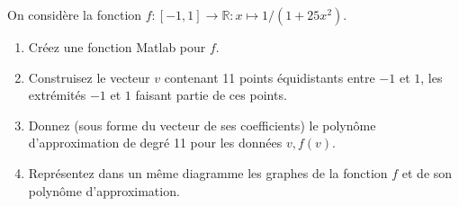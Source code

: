 \begin{exercice}\label{exoMatlab0024}

On considère la fonction $f:[-1,1]\rightarrow \mathbb{R}:x\mapsto 1/(1+25x^2)$.
\begin{enumerate}
\item Créez une fonction Matlab pour $f$.
\item Construisez le vecteur $v$ contenant 11 points équidistants entre $-1$ et $1$, les extrémités $-1$ et $1$ faisant partie de ces points.
\item Donnez (sous forme du vecteur de ses coefficients) le polynôme d'approximation de degré 11 pour les données $v,f(v)$.
\item Représentez dans un même diagramme les graphes de la fonction $f$ et de son polynôme d'approximation.
\end{enumerate}

\end{exercice}
